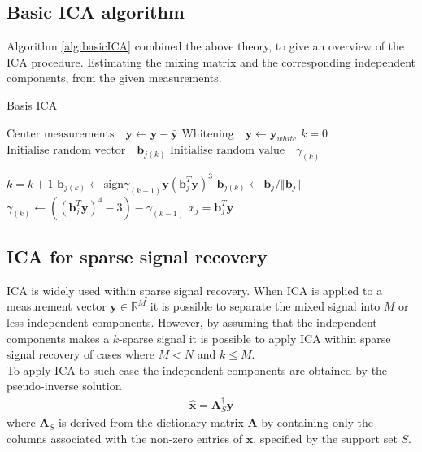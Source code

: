 \subsection{Basic ICA algorithm} 
Algorithm \ref{alg:basicICA} combined the above theory, to give an overview of the ICA procedure. Estimating the mixing matrix and the corresponding independent components, from the given measurements. 
\begin{algorithm}[H]
\caption{Basis ICA}
\begin{algorithmic}[1]
			\State $\text{Center measurements} \quad \textbf{y} \gets \textbf{y} - \bar{\textbf{y}}$
			\State $\text{Whitening} \quad \textbf{y}\gets \textbf{y}_{white}$ 
			\EndProcedure  
			\State
			\State$k=0$            
            \State$\text{Initialise random vector} \quad \textbf{b}_{j(k)}$ 
            \State$\text{Initialise random value} \quad \gamma_{(k)}$
            
               		\State $k = k+1$
                	\State $\textbf{b}_{j(k)} \gets \text{sign}\gamma_{(k-1)} \textbf{y}(\textbf{b}_{j}^T \textbf{y})^3$
                	\State $\textbf{b}_{j(k)} \gets \textbf{b}_j/\Vert \textbf{b}_j \Vert $ 
                	\State $\gamma_{(k)} \gets ((\textbf{b}_{j}^T \textbf{y})^4 - 3) - \gamma_{(k-1)} $
          		\EndWhile
          		\State $x_{j} = \textbf{b}_{j}^T\textbf{y}$
          	\EndFor
          	
            \EndProcedure
        \end{algorithmic} 
        \label{alg:basicICA}
\end{algorithm}

\subsection{ICA for sparse signal recovery}
ICA is widely used within sparse signal recovery.   
When ICA is applied to a measurement vector $\textbf{y}\in\mathbb{R}^{M}$ it is possible to separate the mixed signal into $M$ or less independent components. However, by assuming that the  independent components makes a $k$-sparse signal it is possible to apply ICA within sparse signal recovery of cases where $M < N$ and $k \leq M$. \\
To apply ICA to such case the independent components are obtained by the pseudo-inverse solution 
\begin{align*}
\hat{\mathbf{x}} = \mathbf{A}_S^{\dagger} \mathbf{y}
\end{align*}
where $\mathbf{A}_S$ is derived from the dictionary matrix $\mathbf{A}$ by containing only the columns associated with the non-zero entries of $\textbf{x}$, specified by the support set $S$. 

 

